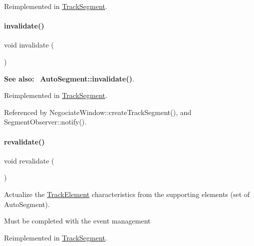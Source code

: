 Reimplemented in \hyperlink{classKite_1_1TrackSegment_ac295bade8aee589f6718dfa79edc2a34}{Track\+Segment}.

\mbox{\label{classKite_1_1TrackElement_a893f1101c650c08c98612515c2b1a89c}} 
\paragraph{\texorpdfstring{invalidate()}{invalidate()}}
{\footnotesize\ttfamily void invalidate (\begin{DoxyParamCaption}{ }\end{DoxyParamCaption})\hspace{0.3cm}{\ttfamily [virtual]}}

{\bfseries See also\+:}~ \textbf{ Auto\+Segment\+::invalidate()}. 

Reimplemented in \hyperlink{classKite_1_1TrackSegment_a893f1101c650c08c98612515c2b1a89c}{Track\+Segment}.



Referenced by Negociate\+Window\+::create\+Track\+Segment(), and Segment\+Observer\+::notify().

\mbox{\label{classKite_1_1TrackElement_a5bd93abe1416952ace15a98dbeeed124}} 
\paragraph{\texorpdfstring{revalidate()}{revalidate()}}
{\footnotesize\ttfamily void revalidate (\begin{DoxyParamCaption}{ }\end{DoxyParamCaption})\hspace{0.3cm}{\ttfamily [virtual]}}

Actualize the \hyperlink{classKite_1_1TrackElement}{Track\+Element} characteristics from the supporting elements (set of Auto\+Segment).

Must be completed with the event management 

Reimplemented in \hyperlink{classKite_1_1TrackSegment_a5bd93abe1416952ace15a98dbeeed124}{Track\+Segment}.


